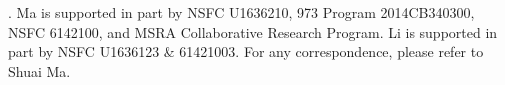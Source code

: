 .
Ma is supported in part by NSFC U1636210, 973 Program 2014CB340300, NSFC 6142100, and  MSRA Collaborative Research Program.
Li is supported in part by NSFC U1636123 \& 61421003.
 For any correspondence, please refer to Shuai Ma.
